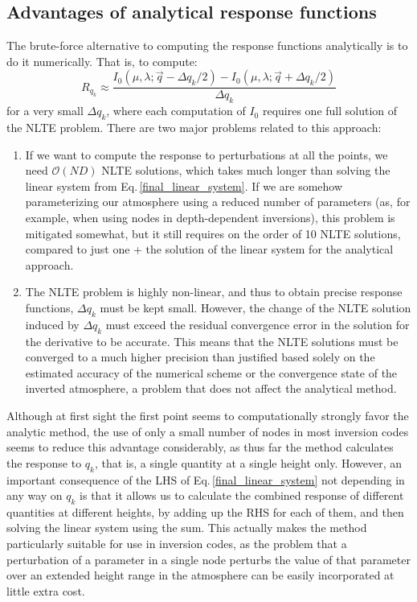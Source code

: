 \documentclass{aa}
\begin{document}
\subsection{Advantages of analytical response functions}

The brute-force alternative to computing the response functions analytically is to do it numerically. That is, to compute:
\begin{equation}
 R_{q_k} \approx \frac{I_0(\mu,\lambda; \vec{q} - \Delta q_k/2) - I_0(\mu,\lambda; \vec{q}+\Delta q_k/2)}{\Delta q_k}
 \label{fin_diff}
\end{equation}
for a very small $\Delta q_k$, where each computation of $I_0$ requires one full solution of the NLTE problem. There are two major problems related to this approach:
\begin{enumerate}
 \item If we want to compute the response to perturbations at all the points, we need $\mathcal{O}(ND)$ NLTE solutions, which takes much longer than solving the linear system from Eq.\,\ref{final_linear_system}. If we are somehow parameterizing our atmosphere using a reduced number of parameters (as, for example, when using nodes in depth-dependent inversions), this problem is mitigated somewhat, but it still requires on the order of 10 NLTE solutions, compared to just one + the solution of the linear system for the analytical approach.
 \item The NLTE problem is highly non-linear, and thus to obtain precise response functions, $\Delta q_k$ must be kept small. However, the change of the NLTE solution induced by $\Delta q_k$ must exceed the residual convergence error in the solution for the derivative to be accurate. This means that the NLTE solutions must be converged to a much higher precision than justified based solely on the estimated accuracy of the numerical scheme or the convergence state of the inverted atmosphere, a problem that does not affect the analytical method.
\end{enumerate}
Although at first sight the first point seems to computationally strongly favor the analytic method, the use of only a small number of nodes in most inversion codes seems to reduce this advantage considerably, as thus far the method calculates the response to $q_k$, that is, a single quantity at a single height only. However, an important consequence of the LHS of Eq.\,\ref{final_linear_system} not depending in any way on $q_k$ is that it allows us to calculate the combined response of different quantities at different heights, by adding up the RHS for each of them, and then solving the linear system using the sum. This actually makes the method particularly suitable for use in inversion codes, as the problem that a perturbation of a parameter in a single node perturbs the value of that parameter over an extended height range in the atmosphere can be easily incorporated at little extra cost.
\end{document}
